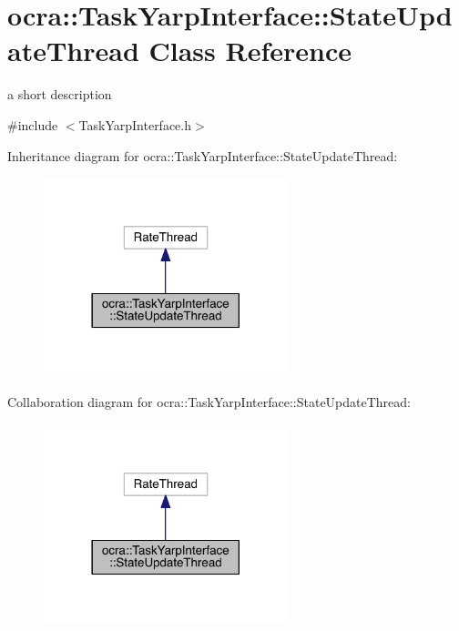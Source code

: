 \hypertarget{classocra_1_1TaskYarpInterface_1_1StateUpdateThread}{}\section{ocra\+:\+:Task\+Yarp\+Interface\+:\+:State\+Update\+Thread Class Reference}
\label{classocra_1_1TaskYarpInterface_1_1StateUpdateThread}


a short description  




{\ttfamily \#include $<$Task\+Yarp\+Interface.\+h$>$}



Inheritance diagram for ocra\+:\+:Task\+Yarp\+Interface\+:\+:State\+Update\+Thread\+:\nopagebreak
\begin{figure}[H]
\begin{center}
\leavevmode
\includegraphics[width=201pt]{df/d01/classocra_1_1TaskYarpInterface_1_1StateUpdateThread__inherit__graph}
\end{center}
\end{figure}


Collaboration diagram for ocra\+:\+:Task\+Yarp\+Interface\+:\+:State\+Update\+Thread\+:\nopagebreak
\begin{figure}[H]
\begin{center}
\leavevmode
\includegraphics[width=201pt]{d5/da6/classocra_1_1TaskYarpInterface_1_1StateUpdateThread__coll__graph}
\end{center}
\end{figure}
